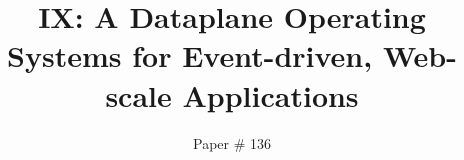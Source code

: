 \documentclass[10pt,twocolumn]{article}
\begin{document}
\title{\bf IX: A Dataplane Operating Systems for \break Event-driven, Web-scale Applications}


\author{Paper \# 136}
\date{}
\maketitle
\thispagestyle{empty}













 



\end{document}
